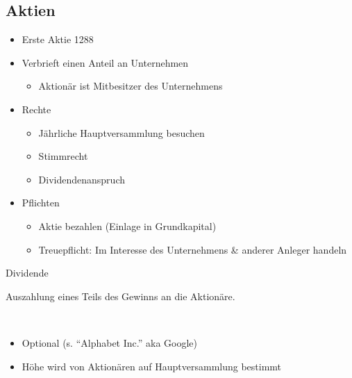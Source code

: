 \documentclass{beamer}
\begin{document}
		\subsection{Aktien}
			
			\begin{frame}
				\begin{itemize}
					\item Erste Aktie 1288
					\item Verbrieft einen Anteil an Unternehmen
					\begin{itemize}
						\item Aktionär ist Mitbesitzer des Unternehmens
					\end{itemize}\pause
					\item Rechte
					\begin{itemize}
						\item Jährliche Hauptversammlung besuchen
						\item Stimmrecht
						\item Dividendenanspruch
					\end{itemize}\pause
					\item Pflichten
					\begin{itemize}
						\item Aktie bezahlen (Einlage in Grundkapital)
						\item Treuepflicht: Im Interesse des Unternehmens \& anderer Anleger handeln
					\end{itemize}
				\end{itemize}
			\end{frame}
		
			\begin{frame}{Dividende}
				\begin{definition}
					Auszahlung eines Teils des Gewinns an die Aktionäre.\citewiki{Dividende}
				\end{definition}
				\hfill\\
				\begin{itemize}
					\item Optional (s. "`Alphabet Inc."' aka Google)
					\item Höhe wird von Aktionären auf Hauptversammlung bestimmt
				\end{itemize}
			\end{frame}
				
\end{document}
